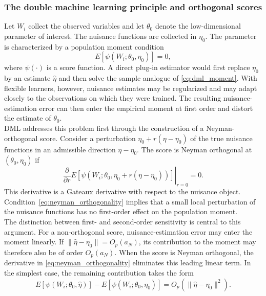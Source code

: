 \documentclass[12pt, a4paper, oneside]{article}
\theoremstyle{plain}
\theoremstyle{definition}
\begin{document}
\subsubsection{The double machine learning principle and orthogonal scores}
Let $W_i$ collect the observed variables and let $\theta_0$ denote the
low-dimensional parameter of interest. The nuisance functions are collected in
$\eta_0$.
The parameter is characterized by a population moment condition
\begin{equation}
    E\!\left[\psi(W_i;\theta_0,\eta_0)\right]=0,
    \label{eq:dml_moment}
\end{equation}
where $\psi(\cdot)$ is a score function. A direct plug-in estimator would first
replace $\eta_0$ by an estimate $\hat\eta$ and then solve the sample analogue of
\eqref{eq:dml_moment}. 
With flexible learners, however, nuisance estimates may
be regularized and may adapt closely to the observations on which they were
trained. The resulting nuisance-estimation error can then enter the empirical
moment at first order and distort the estimate of $\theta_0$.\\
DML addresses this problem first through the construction of a
Neyman-orthogonal score. Consider a perturbation $\eta_0+r(\eta-\eta_0)$ of the
true nuisance functions in an admissible direction $\eta-\eta_0$. The score is
Neyman orthogonal at $(\theta_0,\eta_0)$ if
\begin{equation}
    \left.
    \frac{\partial}{\partial r}
    E\!\left[
      \psi\!\left(W_i;\theta_0,
      \eta_0+r(\eta-\eta_0)\right)
    \right]
    \right|_{r=0}=0.
    \label{eq:neyman_orthogonality}
\end{equation}
This derivative is a Gateaux derivative with respect to the nuisance object.
Condition~\eqref{eq:neyman_orthogonality}  implies that a small local
perturbation of the nuisance functions has no first-order effect on the
population moment.\\
The distinction between first- and second-order sensitivity is central to this
argument. For a non-orthogonal score, nuisance-estimation error may enter the
moment linearly. If $\|\hat\eta-\eta_0\|=O_p(a_N)$, its contribution to the
moment may therefore also be of order $O_p(a_N)$. When the score is Neyman
orthogonal, the derivative in \eqref{eq:neyman_orthogonality} eliminates this
leading linear term. In the simplest case, the remaining contribution takes the
form
\begin{equation}
    E\!\left[\psi(W_i;\theta_0,\hat\eta)\right]
    -E\!\left[\psi(W_i;\theta_0,\eta_0)\right]
    =O_p\!\left(\|\hat\eta-\eta_0\|^2\right).
    \label{eq:dml_second_order}
\end{equation}
\end{document}
